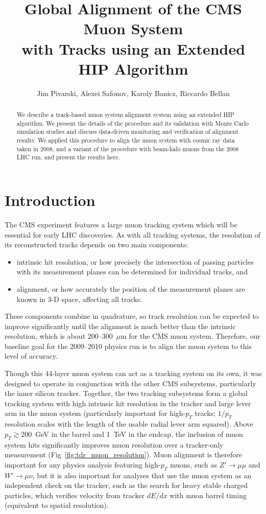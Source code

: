 \documentclass[12pt]{article}
\title{Global Alignment of the CMS Muon System \\ with Tracks using an Extended HIP Algorithm}
\author{Jim Pivarski, Alexei Safonov, Karoly Banicz, Riccardo Bellan}
\begin{document}
\maketitle
\begin{abstract}
We describe a track-based muon system alignment system using an
extended HIP algorithm.  We present the details of the procedure and
its validation with Monte Carlo simulation studies and discuss
data-driven monitoring and verification of alignment results.  We
applied this procedure to align the muon system with cosmic ray data
taken in 2008, and a variant of the procedure with beam-halo muons
from the 2008 LHC run, and present the results here.
\end{abstract}
\pagebreak

\tableofcontents
\pagebreak

\section{Introduction}

The CMS experiment features a large muon tracking system which will be
essential for early LHC discoveries.  As with all tracking systems,
the resolution of its reconstructed tracks depends on two main
components:
\begin{itemize}
\item intrinsic hit resolution, or how precisely the intersection of
  passing particles with its measurement planes can be determined for
  individual tracks, and
\item alignment, or how accurately the position of the measurement
  planes are known in 3-D space, affecting all tracks.
\end{itemize}
These components combine in quadrature, so track resolution can be
expected to improve significantly until the alignment is much better
than the intrinsic resolution, which is about 200--300~$\mu$m for the
CMS muon system.  Therefore, our baseline goal for the 2009--2010
physics run is to align the muon system to this level of accuracy.

Though this 44-layer muon system can act as a tracking system on its
own, it was designed to operate in conjunction with the other CMS
subsystems, particularly the inner silicon tracker.  Together, the two
tracking subsystems form a global tracking system with high intrinsic
hit resolution in the tracker and large lever arm in the muon system
(particularly important for high-$p_T$ tracks; $1/p_T$ resolution
scales with the length of the usable radial lever arm squared).  Above
$p_T \gtrsim 200$~GeV in the barrel and 1~TeV in the endcap, the
inclusion of muon system hits significantly improves muon resolution
over a tracker-only measurement (Fig~\ref{fig:tdr_muon_resolution}).
Muon alignment is therefore important for any physics analysis
featuring high-$p_T$ muons, such as $Z' \to \mu\mu$ and $W' \to
\mu\nu$, but it is also important for analyses that use the muon
system as an independent check on the tracker, such as the search for
heavy stable charged particles, which verifies velocity from tracker
$dE/dx$ with muon barrel timing (equivalent to spatial resolution).
\end{document}
